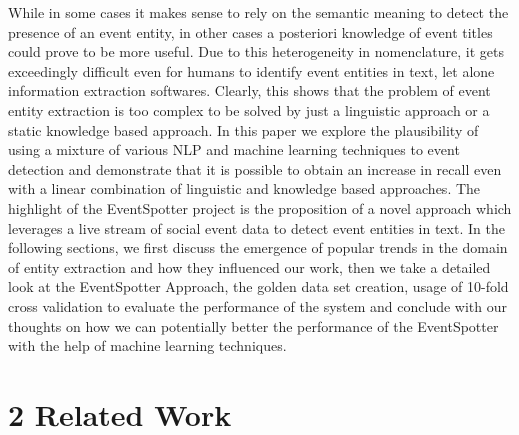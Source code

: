 \documentclass[a4paper,11pt]{report}
\begin{document}
While in some cases it makes sense to rely on the semantic meaning to detect the presence of an event entity, in other cases a posteriori knowledge of event titles could prove to be more useful.  Due to this heterogeneity in nomenclature, it gets exceedingly difficult even for humans to identify event entities in text, let alone information extraction softwares.  Clearly, this shows that the problem of event entity extraction is too complex to be solved by just a linguistic approach or a static knowledge based approach. In this paper we explore the plausibility of using a mixture of various NLP and machine learning techniques to event detection and demonstrate that it is possible to obtain an increase in recall even with a linear combination of linguistic and knowledge based approaches. The highlight of the EventSpotter project is the proposition of a novel approach which leverages a live stream of social event data to detect event entities in text. In the following sections, we first discuss the emergence of popular trends in the domain of entity extraction and how they influenced our work, then we take a detailed look at the EventSpotter Approach, the golden data set creation, usage of 10-fold cross validation to evaluate the performance of the system and conclude with our thoughts on how we can potentially better the performance of the EventSpotter with the help of machine learning techniques.

\chapter*{2 Related Work}
\end{document}
